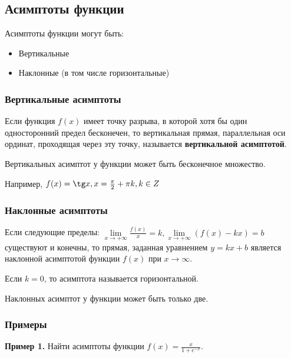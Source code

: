 \documentclass{article}
\begin{document}
\subsection{Асимптоты функции}

\begin{flushleft}

Асимптоты функции могут быть:
\begin{itemize}
    \item Вертикальные
    \item Наклонные (в том числе горизонтальные)
\end{itemize}

\subsubsection{Вертикальные асимптоты}

Если функция $f(x)$ имеет точку разрыва, в которой хотя бы один односторонний предел бесконечен, то вертикальная прямая, параллельная оси ординат, проходящая через эту точку, называется \textbf{вертикальной асимптотой}.

\hfill

Вертикальных асимптот у функции может быть бесконечное множество.

\hfill

Например, $f(x) = \tg x, x = \frac{\pi}{2} + \pi k, k \in Z$

\subsubsection{Наклонные асимптоты}

Если следующие пределы: $\lim\limits_{x \to +\infty} \frac{f(x)}{x} = k, \lim\limits_{x \to +\infty} (f(x) - k x) = b$ существуют и конечны, то прямая, заданная уравнением $y = k x + b$ является наклонной асимптотой функции $f(x)$ при $x \to \infty$.

\hfill

Если $k = 0$, то асимптота называется горизонтальной.

\hfill

Наклонных асимптот у функции может быть только две.

\subsubsection{Примеры}

\textbf{Пример 1.} Найти асимптоты функции $f(x) = \frac{x}{1 + e^{-x}}$.


\end{flushleft}
\end{document}
